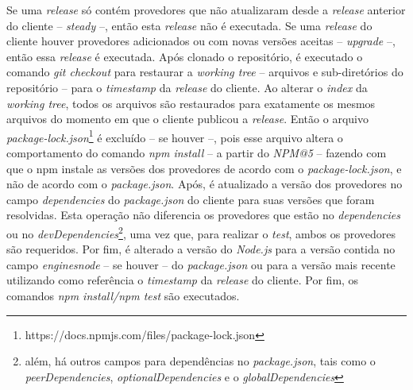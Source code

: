 Se uma \textit{release} só contém provedores que não atualizaram desde a \textit{release} anterior do cliente -- \textit{steady} --, então esta \textit{release} não é executada. Se uma \textit{release} do cliente houver provedores adicionados ou com novas versões aceitas -- \textit{upgrade} --, então essa \textit{release} é executada. Após clonado o repositório, é executado o comando \textit{git checkout} para restaurar a \textit{working tree} -- arquivos e sub-diretórios do repositório -- para o \textit{timestamp} da \textit{release} do cliente. Ao alterar o \textit{index} da \textit{working tree}, todos os arquivos são restaurados para exatamente os mesmos arquivos do momento em que o cliente publicou a \textit{release}. Então o arquivo \textit{package-lock.json}\footnote{https://docs.npmjs.com/files/package-lock.json} é excluído -- se houver --, pois esse arquivo altera o comportamento do comando \textit{npm install} -- a partir do \textit{NPM@5} -- fazendo com que o \gls{npm} instale as versões dos provedores de acordo com o \textit{package-lock.json}, e não de acordo com o \textit{package.json}. Após, é atualizado a versão dos provedores no campo \textit{dependencies} do \textit{package.json} do cliente para suas versões que foram resolvidas. Esta operação não diferencia os provedores que estão no \textit{dependencies} ou no \textit{devDependencies}\footnote{além, há outros campos para dependências no \textit{package.json}, tais como o \textit{peerDependencies}, \textit{optionalDependencies} e o \textit{globalDependencies}}, uma vez que, para realizar o \textit{test}, ambos os provedores são requeridos. Por fim, é alterado a versão do \textit{Node.js} para a versão contida no campo \textit{engines\textrightarrow node} -- se houver -- do \textit{package.json} ou para a versão mais recente utilizando como referência o \textit{timestamp} da \textit{release} do cliente. Por fim, os comandos \textit{npm install/npm test} são executados.

